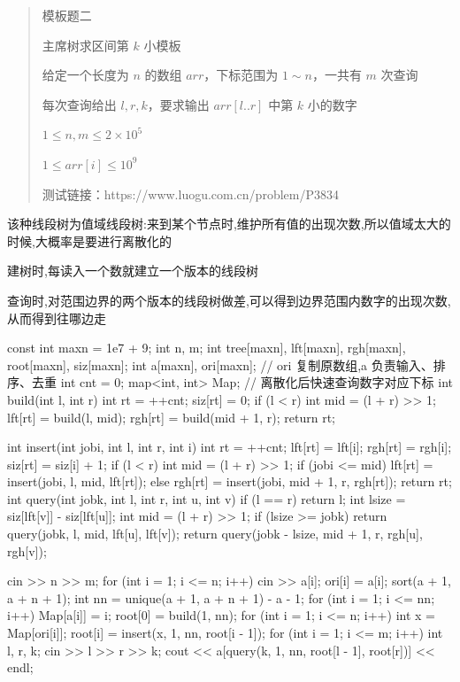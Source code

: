 \documentclass[UTF8,a4paper,11pt]{ctexart}
\newcommand{\topic}[1]{%
  \par\needspace{3\baselineskip}\vspace{0.45em}%
  \noindent{\bfseries\color{Primary}#1}\par\vspace{0.12em}%
}
\begin{document}
\topic{第 k 小主席树}

\begin{quote}
模板题二\par
主席树求区间第 $k$ 小模板\par
给定一个长度为 $n$ 的数组 $arr$，下标范围为 $1 \sim n$，一共有 $m$ 次查询\par
每次查询给出 $l,r,k$，要求输出 $arr[l..r]$ 中第 $k$ 小的数字\par
$1 \le n,m \le 2 \times 10^5$\par
$1 \le arr[i] \le 10^9$\par
测试链接：https://www.luogu.com.cn/problem/P3834\par
\end{quote}

该种线段树为值域线段树:来到某个节点时,维护所有值的出现次数,所以值域太大的时候,大概率是要进行离散化的

建树时,每读入一个数就建立一个版本的线段树

查询时,对范围边界的两个版本的线段树做差,可以得到边界范围内数字的出现次数,从而得到往哪边走

\begin{CodeBlock}
const int maxn = 1e7 + 9;
int n, m;
int tree[maxn], lft[maxn], rgh[maxn], root[maxn], siz[maxn];
int a[maxn], ori[maxn]; // ori 复制原数组,a 负责输入、排序、去重
int cnt = 0;
map<int, int> Map; // 离散化后快速查询数字对应下标
int build(int l, int r) {
    int rt = ++cnt;
    siz[rt] = 0;
    if (l < r) {
        int mid = (l + r) >> 1;
        lft[rt] = build(l, mid);
        rgh[rt] = build(mid + 1, r);
    }
    return rt;
}
\end{CodeBlock}

\begin{CodeBlock}
int insert(int jobi, int l, int r, int i) {
    int rt = ++cnt;
    lft[rt] = lft[i];
    rgh[rt] = rgh[i];
    siz[rt] = siz[i] + 1;
    if (l < r) {
        int mid = (l + r) >> 1;
        if (jobi <= mid)
            lft[rt] = insert(jobi, l, mid, lft[rt]);
        else
            rgh[rt] = insert(jobi, mid + 1, r, rgh[rt]);
    }
    return rt;
}
int query(int jobk, int l, int r, int u, int v) {
    if (l == r)
        return l;
    int lsize = siz[lft[v]] - siz[lft[u]];
    int mid = (l + r) >> 1;
    if (lsize >= jobk)
        return query(jobk, l, mid, lft[u], lft[v]);
    return query(jobk - lsize, mid + 1, r, rgh[u], rgh[v]);
}
\end{CodeBlock}

\begin{CodeBlock}
cin >> n >> m;
for (int i = 1; i <= n; i++) {
    cin >> a[i];
    ori[i] = a[i];
}
sort(a + 1, a + n + 1);
int nn = unique(a + 1, a + n + 1) - a - 1;
for (int i = 1; i <= nn; i++)
    Map[a[i]] = i;
root[0] = build(1, nn);
for (int i = 1; i <= n; i++) {
    int x = Map[ori[i]];
    root[i] = insert(x, 1, nn, root[i - 1]);
}
for (int i = 1; i <= m; i++) {
    int l, r, k;
    cin >> l >> r >> k;
    cout << a[query(k, 1, nn, root[l - 1], root[r])] << endl;
}
\end{CodeBlock}
\end{document}
